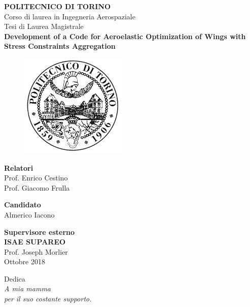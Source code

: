 \documentclass[12pt,english,cucitura,oneside]{toptesi}
\begin{document}
\english
\thispagestyle{empty}
\begin{center}
\Large{\textbf{POLITECNICO DI TORINO} \\}
\vspace{0.3cm}
\large{Corso di laurea in Ingegneria Aerospaziale\\}
\vspace{0.5cm}
\Large{Tesi di Laurea Magistrale\\}
\vspace{0.3cm}
\textbf{\LARGE{Development of a Code for Aeroelastic Optimization of Wings with Stress Constraints Aggregation\\}}
\end{center}
\vspace{0.1cm}
\begin{figure}
\centering
\includegraphics[width=2in]{./Immagini/polito.png}
\end{figure}
\vspace{0.1cm}
\begin{flushleft}
\large{
\textbf{Relatori}\\
Prof. Enrico Cestino\\
Prof. Giacomo Frulla
\vspace{0.1cm}}
\end{flushleft}
\begin{flushright}
\vspace{0.1cm}
\large{\textbf{Candidato}\\
Almerico Iacono}
\end{flushright}
\vspace{0.1cm}
\begin{center}
\large{
\textbf{Supervisore esterno\\
ISAE SUPAREO}\\
Prof. Joseph Morlier\\}
\vspace{0.1cm}
\large{Ottobre 2018}
\end{center}

\newpage
\null{}
\begin{flushright}
Dedica\\
\textit{A mia mamma \\
per il suo costante supporto.}
\end{flushright}
\null{}
\newpage
\end{document}
